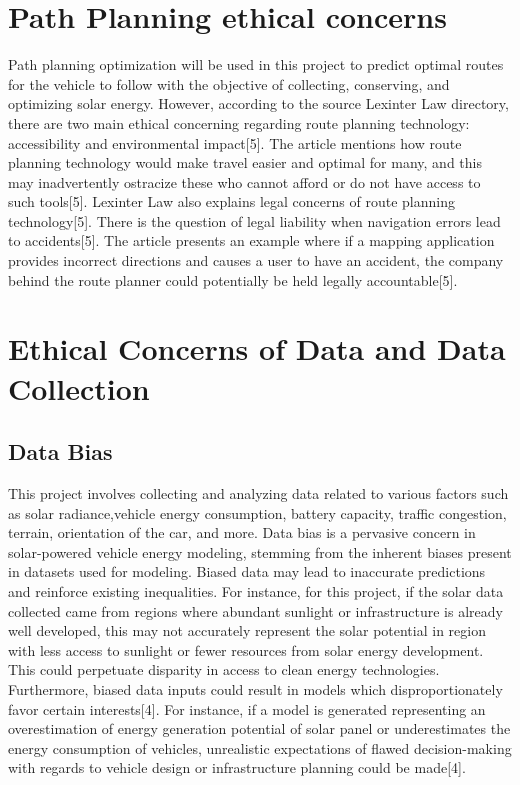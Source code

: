 \documentclass[10pt,twocolumn]{article}
\begin{document}
\section{Path Planning ethical concerns}
Path planning optimization will be used in this project to predict optimal routes for the vehicle to follow  with the objective of collecting, conserving, and optimizing solar energy. However, according to the source Lexinter Law directory, there are two main ethical concerning regarding route planning technology: accessibility and environmental impact[5]. The article mentions how route planning technology would make travel easier and optimal for many, and this may inadvertently ostracize these who cannot afford or do not have access to such tools[5]. Lexinter Law also explains legal concerns of route planning technology[5]. There is the question of legal liability when navigation errors lead to accidents[5]. The article presents an example where if a mapping application provides incorrect directions and causes a user to have an accident, the company behind the route planner could potentially be held legally accountable[5].

\section{Ethical Concerns of Data and Data Collection}

\subsection{Data Bias}
This project involves collecting and analyzing data related to various factors such as solar radiance,vehicle energy consumption, battery capacity, traffic congestion, terrain, orientation of the car,  and more. Data bias is a pervasive concern in solar-powered vehicle energy modeling, stemming from the inherent biases present in datasets used for modeling. Biased data may lead to inaccurate predictions and reinforce existing inequalities. For instance, for this project, if the solar data collected came from regions where abundant sunlight or infrastructure is already well developed, this may not accurately represent the solar potential in region with less access to sunlight or fewer resources from solar energy development. This could perpetuate disparity in access to clean energy technologies. Furthermore, biased data inputs could result in models which disproportionately favor certain interests[4]. For instance, if a model is generated representing an overestimation of energy generation potential of solar panel or underestimates the energy consumption of vehicles, unrealistic expectations of flawed decision-making with regards to vehicle design or infrastructure planning could be made[4]. 
 
\end{document}
